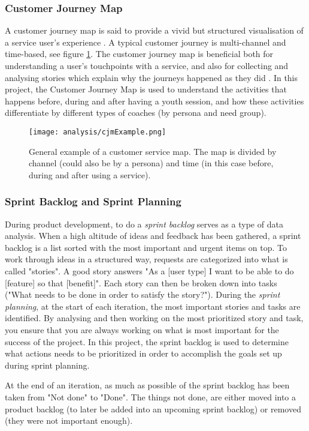 \subsubsection{Customer Journey Map}
A customer journey map is said to provide a vivid but structured visualisation of a service user's experience \citep{stickdorn}. A typical customer journey is multi-channel and time-based, see figure \ref{fig:cjmExample}. The customer journey map is beneficial both for understanding a user's touchpoints with a service, and also for collecting and analysing stories which explain why the journeys happened as they did \citep{stickdorn}. In this project, the Customer Journey Map is used to understand the activities that happens before, during and after having a youth session, and how these activities differentiate by different types of coaches (by persona and need group).

\begin{figure}[h]
    \centering
    \texttt{[image: analysis/cjmExample.png]}
    \caption{General example of a customer service map. The map is divided by channel (could also be by a persona) and time (in this case before, during and after using a service).}
    \label{fig:cjmExample}
\end{figure}

\subsubsection{Sprint Backlog and Sprint Planning}
During product development, to do a \textit{sprint backlog} serves as a type of data analysis. When a high altitude of ideas and feedback has been gathered, a sprint backlog is a list sorted with the most important and urgent items on top. To work through ideas in a structured way, requests are categorized into what is called "stories". A good story answers "As a [user type] I want to be able to do [feature] so that [benefit]". Each story can then be broken down into tasks ("What needs to be done in order to satisfy the story?"). During the \textit{sprint planning}, at the start of each iteration, the most important stories and tasks are identified. By analysing and then working on the most prioritized story and task, you ensure that you are always working on what is most important for the success of the project. In this project, the sprint backlog is used to determine what actions needs to be prioritized in order to accomplish the goals set up during sprint planning.

At the end of an iteration, as much as possible of the sprint backlog has been taken from "Not done" to "Done". The things not done, are either moved into a product backlog (to later be added into an upcoming sprint backlog) or removed (they were not important enough).

